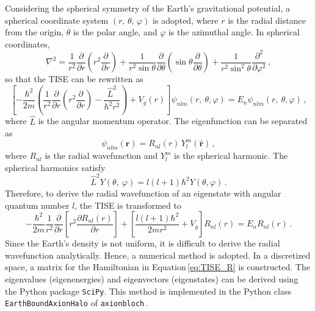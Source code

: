 Considering the spherical symmetry of the Earth's gravitational potential, a spherical coordinate system $(r,\,\theta,\,\varphi)$ is adopted, where $r$ is the radial distance from the origin, $\theta$ is the polar angle, and $\varphi$ is the azimuthal angle.
In spherical coordinates,
\begin{equation}
    \nabla^2 = \frac{1}{{r}^2}\frac{\partial}{\partial r}\left(r^2\frac{\partial}{\partial r}\right)+\frac{1}{r^2\sin\theta}\frac{\partial}{\partial \theta}\left(\sin\theta\frac{\partial}{\partial \theta}\right)+\frac{1}{r^2\sin^2\theta}\frac{\partial^2}{\partial \varphi^2}
    \,,\label{eq:laplacian_spherical}
\end{equation}
so that the TISE can be rewritten as
\begin{equation}
    \left[-\frac{\hbar^2}{2m}\left(\frac{1}{{r}^2}\frac{\partial}{\partial r}\left(r^2\frac{\partial}{\partial r}\right)-\frac{{\hat{L}}^2}{\hbar^2r^2}\right)+V_g(r)\right]\psi_{nlm}\left(r,\ \theta,\varphi\right)=E_{n}\psi_{nlm}\left(r,\ \theta,\varphi\right)
    \,,
\end{equation}
where $\hat{L}$ is the angular momentum operator.
The eigenfunction can be separated as
\begin{equation}
    \psi_{nlm}(\boldsymbol{r}) = R_{nl}(r)\,Y_l^m(\hat{\boldsymbol{r}})
    \,,\label{eq:psi_R_Y}
\end{equation}
where $R_{nl}$ is the radial wavefunction and $Y_l^m$ is the spherical harmonic.
The spherical harmonics satisfy
\begin{equation}
    {\hat{L}}^2Y\left(\theta,\ \varphi\right)=l\left(l+1\right)\hbar^2Y\left(\theta,\varphi\right)
    \,.
\end{equation}
Therefore, to derive the radial wavefunction of an eigenstate with angular quantum number $l$, the TISE is transformed to
\begin{equation}
    -\frac{\hbar^2}{2m}\frac{1}{{r}^2}\frac{\partial}{\partial r}\left[r^2\frac{\partial R_{nl}\left(r\right)}{\partial r}\right]+\left[\frac{l\left(l+1\right)\hbar^2}{2mr^2}+V_g\right]R_{nl}\left(r\right)=E_{n}R_{nl}\left(r\right)
    \,.
    \label{eq:TISE_R}
\end{equation}
Since the Earth's density is not uniform, it is difficult to derive the radial wavefunction analytically.
Hence, a numerical method is adopted.
In a discretized space, a matrix for the Hamiltonian in Equation\,\eqref{eq:TISE_R} is constructed.
The eigenvalues (eigenenergies) and eigenvectors (eigenstates) can be derived using the Python package \texttt{SciPy}.
This method is implemented in the Python class \texttt{EarthBoundAxionHalo} of \texttt{axionbloch}\,\cite{Zhang2026_axionbloch}.

